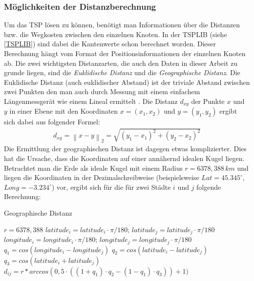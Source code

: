\documentclass[doktyp=barbeit, sprache=german]{TUBAFarbeiten}
\begin{document}
\subsubsection{Möglichkeiten der Distanzberechnung}
Um das TSP lösen zu können, benötigt man Informationen über die Distanzen bzw. die Wegkosten zwischen den einzelnen Knoten. In der TSPLIB (siehe \ref{TSPLIB}) sind dabei die Kantenwerte schon berechnet worden. Dieser Berechnung hängt vom Format der Positionsinformationen der einzelnen Knoten ab. Die zwei wichtigsten Distanzarten, die auch den Daten in dieser Arbeit zu grunde liegen, sind die \textit{Euklidische Distanz} und die \textit{Geographische Distanz}. Die Euklidische Distanz (auch euklidischer Abstand) ist der triviale Abstand zwischen zwei Punkten den man auch durch Messung mit einem einfachem Längenmessgerät wie einem Lineal ermittelt \cite{Distanz}. Die Distanz $d_{xy}$ der Punkte $x$ und $y$ in einer Ebene mit den Koordinaten $x = (x_1, x_2)$ und $y = (y_1, y_2)$ ergibt sich dabei aus folgender Formel:
\begin{align}
\label{eq:Euclid}
d_{xy} = \left\| x - y \right\|_2 = \sqrt{{(y_1-x_1)}^2+{(y_2-x_2)}^2}
\end{align}
Die Ermittlung der geographischen Distanz ist dagegen etwas komplizierter. Dies hat die Ursache, dass die Koordinaten auf einer annähernd idealen Kugel liegen. Betrachtet man die Erde als ideale Kugel mit einem Radius $r = 6378,388 \,km$ und liegen die Koordinaten in der Dezimalschreibweise (beispielsweise $Lat=45.345^\circ$, $Long=-3.234^\circ$) vor, ergibt sich für die für zwei Städte $i$ und $j$ folgende Berechnung:
\begin{algorithm}
\caption{Geographische Distanz}
\label{geodistance}
\begin{algorithmic}[1]
\State $r = 6378,388$
\State $latitude_i = latitude_i \cdot \pi / 180; \,latitude_j = latitude_j \cdot \pi / 180$
\State $longitude_i = longitude_i \cdot \pi / 180;\, longitude_j =longitude_j \cdot \pi / 180$
\State $q_1 = cos(longitude_i - longitude_j)$
\State $q_2 = cos(latitude_i - latitude_j)$
\State $q_3 = cos(latitude_i + latitude_j)$
\State \textbf{$d_{ij} = r * arccos(0,5 \cdot ((1 + q_1) \cdot q_2 - (1 - q_1) \cdot q_3)) + 1)$}
\end{algorithmic}
\end{algorithm}
\end{document}

